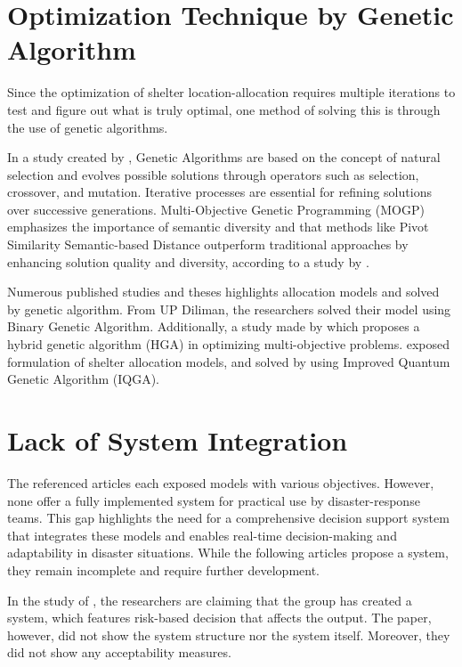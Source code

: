 \section{Optimization Technique by Genetic Algorithm}
	Since the optimization of shelter location-allocation  requires multiple iterations to test and figure out what is truly optimal, one method of solving this is through the use of genetic algorithms.
	
	In a study created by \textcite{Mathew2012}, Genetic Algorithms are based on the concept of natural selection and evolves possible solutions through operators such as selection, crossover, and mutation. Iterative processes are essential for refining solutions over successive generations. Multi-Objective Genetic Programming (MOGP) emphasizes the importance of semantic diversity and that methods like Pivot Similarity Semantic-based Distance outperform traditional approaches by enhancing solution quality and diversity, according to a study by \textcite{Edgar2020}.
	
	Numerous published studies and theses highlights allocation models and solved by genetic algorithm. From UP Diliman, the researchers solved their model using Binary Genetic Algorithm. Additionally, a study made by \textcite{Ahmed2020}  which proposes a hybrid genetic algorithm (HGA) in optimizing multi-objective problems. \textcite{Yin2023} exposed formulation of shelter allocation models, and solved by using Improved Quantum Genetic Algorithm (IQGA). 
	

\section{Lack of System Integration}
	The referenced articles each exposed models with various objectives. However, none offer a fully implemented system for practical use by disaster-response teams. This gap highlights the need for a comprehensive decision support system that integrates these models and enables real-time decision-making and adaptability in disaster situations. While the following articles propose a system, they remain incomplete and require further development.
	
	In the study of \textcite{Amir2023}, the researchers are claiming that the group has created a system, which features risk-based decision that affects the output. The paper, however, did not show the system structure nor the system itself. Moreover, they did not show any acceptability measures. \parencite{Amir2023}
	
